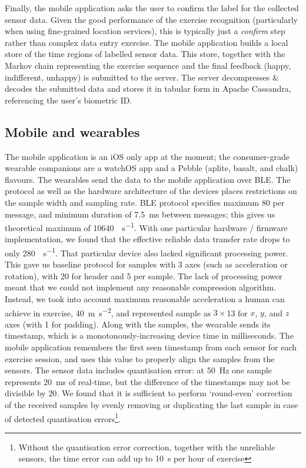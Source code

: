 \documentclass[a4paper, 10 pt, conference]{IEEEtran}
\begin{document}
Finally, the mobile application asks the user to confirm the label for the collected sensor data. Given the good performance of the exercise recognition (particularly when using fine-grained location services), this is typically just a \emph{confirm} step rather than complex data entry exercise. The mobile application builds a local store of the time regions of labelled sensor data. This store, together with the Markov chain representing the exercise sequence and the final feedback (happy, indifferent, unhappy) is submitted to the server. The server decompresses \& decodes the submitted data and stores it in tabular form in Apache Cassandra, referencing the user's biometric ID. 

\subsection{Mobile and wearables}

The mobile application is an iOS only app at the moment; the consumer-grade wearable companions are a watchOS app and a Pebble (aplite, basalt, and chalk) flavours. The wearables send the data to the mobile application over BLE. The protocol as well as the hardware architecture of the devices places restrictions on the sample width and sampling rate. BLE protocol specifies maximum \SI{80}{\byte} per message, and minimum duration of \SI{7.5}{\milli\second} between messages; this gives us theoretical maximum of \SI{10640}{\byte\per\second}. With one particular hardware / firmware implementation, we found that the effective reliable data transfer rate drops to only \SI{280}{\byte\per\second}. That particular device also lacked significant processing power. This gave us baseline protocol for samples with 3 axes (such as acceleration or rotation), with \SI{20}{\byte} for header and \SI{5}{\byte} per sample. The lack of processing power meant that we could not implement any reasonable compression algorithm. Instead, we took into account maximum reasonable acceleration a human can achieve in exercise, \SI{40}{\meter\second^{-2}}, and represented sample as $3 \times$\SI{13}{\bit} for $x$, $y$, and $z$ axes (with \SI{1}{\bit} for padding). Along with the samples, the wearable sends its timestamp, which is a monotonously-increasing device time in milliseconds. The mobile application remembers the first seen timestamp from each sensor for each exercise session, and uses this value to properly align the samples from the sensors. The sensor data includes quantisation error: at \SI{50}{\hertz} one sample represents \SI{20}{\milli\second} of real-time, but the difference of the timestamps may not be divisible by $20$. We found that it is sufficient to perform `round-even' correction of the received samples by evenly removing or duplicating the last sample in case of detected quantisation errors\footnote{Without the quantisation error correction, together with the unreliable sensors, the time error can add up to \SI{10}{\second} per hour of exercise}.
\end{document}
